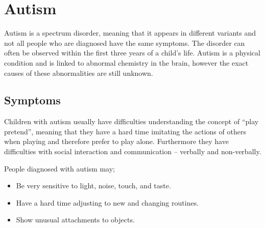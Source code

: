 \section{Autism}
\label{sec:autism}
Autism is a spectrum disorder, meaning that it appears in different variants and not all people who are diagnosed have the same symptoms. The disorder can often be observed within the first three years of a child's life.
Autism is a physical condition and is linked to abnormal chemistry in the brain, however the exact causes of these abnormalities are still unknown.\citep{autism}





\subsection*{Symptoms}
\label{sub:symptoms}
Children with autism usually have difficulties understanding the concept of ``play pretend'', meaning that they have a hard time imitating the actions of others when playing and therefore prefer to play alone. Furthermore they have difficulties with social interaction and communication -- verbally and non-verbally.

People diagnosed with autism may;


\begin{itemize}
\item Be very sensitive to light, noise, touch, and taste.
\item Have a hard time adjusting to new and changing routines.
\item Show unusual attachments to objects.
\end{itemize}

